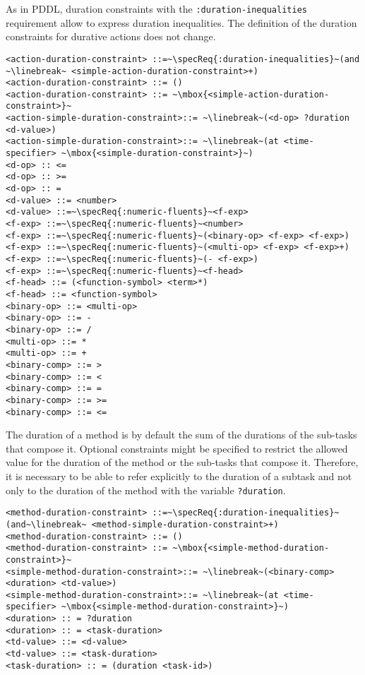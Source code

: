 \documentclass{article}
\begin{document}
%
%
As in PDDL, duration constraints with the \verb|:duration-inequalities| requirement allow to express duration inequalities. The definition of the duration constraints for durative actions does not change.

\begin{lstlisting}[firstnumber=last, escapechar=~]
<action-duration-constraint> ::=~\specReq{:duration-inequalities}~(and ~\linebreak~ <simple-action-duration-constraint>+)
<action-duration-constraint> ::= ()
<action-duration-constraint> ::= ~\mbox{<simple-action-duration-constraint>}~
<action-simple-duration-constraint>::= ~\linebreak~(<d-op> ?duration <d-value>)
<action-simple-duration-constraint>::= ~\linebreak~(at <time-specifier> ~\mbox{<simple-duration-constraint>}~)
<d-op> :: <=
<d-op> :: >=
<d-op> :: =
<d-value> ::= <number>
<d-value> ::=~\specReq{:numeric-fluents}~<f-exp>
<f-exp> ::=~\specReq{:numeric-fluents}~<number>
<f-exp> ::=~\specReq{:numeric-fluents}~(<binary-op> <f-exp> <f-exp>)
<f-exp> ::=~\specReq{:numeric-fluents}~(<multi-op> <f-exp> <f-exp>+)
<f-exp> ::=~\specReq{:numeric-fluents}~(- <f-exp>)
<f-exp> ::=~\specReq{:numeric-fluents}~<f-head>
<f-head> ::= (<function-symbol> <term>*)
<f-head> ::= <function-symbol>
<binary-op> ::= <multi-op>
<binary-op> ::= -
<binary-op> ::= /
<multi-op> ::= *
<multi-op> ::= +
<binary-comp> ::= >
<binary-comp> ::= <
<binary-comp> ::= =
<binary-comp> ::= >=
<binary-comp> ::= <=
\end{lstlisting}

%
%
The duration of a method is by default the sum of the durations of the sub-tasks that compose it. Optional constraints might be specified to restrict the allowed value for the
duration of the method or the sub-tasks that compose it. Therefore, it is necessary to be able to refer explicitly to the duration of a subtask and not only to the duration of the method with the variable {\tt ?duration}.

\begin{lstlisting}[firstnumber=last, escapechar=~]
<method-duration-constraint> ::=~\specReq{:duration-inequalities}~ (and~\linebreak~ <method-simple-duration-constraint>+)
<method-duration-constraint> ::= ()
<method-duration-constraint> ::= ~\mbox{<simple-method-duration-constraint>}~
<simple-method-duration-constraint>::= ~\linebreak~(<binary-comp> <duration> <td-value>)
<simple-method-duration-constraint>::= ~\linebreak~(at <time-specifier> ~\mbox{<simple-method-duration-constraint>}~)
<duration> :: = ?duration 
<duration> :: = <task-duration>
<td-value> ::= <d-value> 
<td-value> ::= <task-duration>
<task-duration> :: = (duration <task-id>)
\end{lstlisting}
\end{document}
